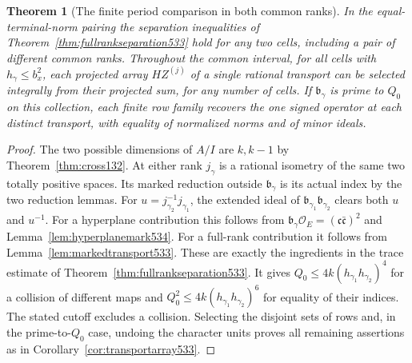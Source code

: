 \documentclass[a4paper,11pt]{article}
\newtheorem{theorem}[proposition]{Theorem}
\theoremstyle{definition}
\theoremstyle{remark}
\numberwithin{equation}{section}
\begin{document}
\begin{theorem}[The finite period comparison in both common ranks]
\leavevmode\label{thm:bothranks534}
In the equal-terminal-norm pairing the separation inequalities
of Theorem~\ref{thm:fullrankseparation533} hold for any two cells,
including a pair of different common ranks. Throughout the common
interval, for all cells with \(h_\gamma\le b_x^2\), each projected
array \(HZ^{(j)}\) of a single rational transport can be selected
integrally from their projected sum, for any number of cells.
If \(\mathfrak b_\gamma\) is prime to \(Q_0\) on this collection,
each finite row family recovers the one signed operator at each
distinct transport, with equality of normalized norms and of
minor ideals.
\end{theorem}
\begin{proof}
The two possible dimensions of \(A/I\) are \(k,k-1\) by
Theorem~\ref{thm:cross132}. At either rank \(j_\gamma\) is a
rational isometry of the same two totally positive spaces.
Its marked reduction outside \(\mathfrak b_\gamma\) is its
actual index by the two reduction lemmas. For
\(u=j_{\gamma_2}^{-1}j_{\gamma_1}\), the extended ideal of
\(\mathfrak b_{\gamma_1}\mathfrak b_{\gamma_2}\) clears both
\(u\) and \(u^{-1}\). For a hyperplane contribution this follows
from \(\mathfrak b_\gamma\mathcal O_E=(\mathfrak c\bar{\mathfrak c})^2\)
and Lemma~\ref{lem:hyperplanemark534}. For a full-rank contribution
it follows from Lemma~\ref{lem:markedtransport533}.
These are exactly the ingredients in the trace estimate of
Theorem~\ref{thm:fullrankseparation533}. It gives
\(Q_0\le4k(h_{\gamma_1}h_{\gamma_2})^4\) for a collision
of different maps and \(Q_0^2\le4k(h_{\gamma_1}h_{\gamma_2})^6\)
for equality of their indices. The stated cutoff excludes a
collision. Selecting the disjoint sets of rows and, in the
prime-to-\(Q_0\) case, undoing the character units proves all
remaining assertions as in Corollary~\ref{cor:transportarray533}.
\end{proof}
\end{document}
